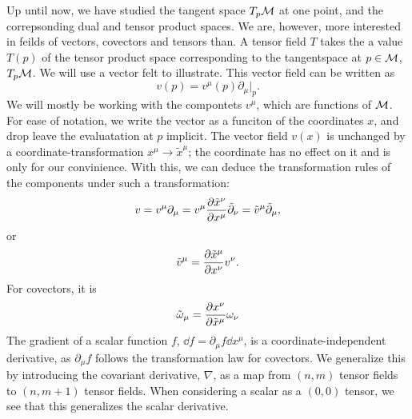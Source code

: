 Up until now, we have studied the tangent space $T_p \mathcal{M}$ at one point, and the correpsonding dual and tensor product spaces.
We are, however, more interested in feilds of vectors, covectors and tensors than.
A tensor field $T$ takes the a value $T(p)$ of the tensor product space corresponding to the tangentspace at $p\in \mathcal{M}$, $T_p \mathcal{M}$.
We will use a vector felt to illustrate.
This vector field can be written as
%
\begin{equation}
    v(p) = v^\mu(p) \partial_\mu |_p. 
\end{equation}
%
We will mostly be working with the compontets $v^\mu$, which are functions of $\mathcal{M}$.
For ease of notation, we write the vector as a funciton of the coordinates $x$, and drop leave the evaluatation at $p$ implicit.
The vector field $v(x)$ is unchanged by a coordinate-transformation $x^\mu \rightarrow \tilde x^\mu$; the coordinate has no effect on it and is only for our convinience. 
With this, we can deduce the transformation rules of the components under such a transformation:
%
\begin{equation}
    v = v^\mu \partial_\mu = v^\mu \diffp{\tilde x^\nu}{x^\mu} \tilde  \partial_\nu
    = \tilde v^\mu \tilde \partial_\mu, 
\end{equation}
%
or
%
\begin{equation}
    \tilde v^\mu = \diffp{\tilde x^\mu}{x^\nu} v^\nu.
\end{equation}
%
For covectors, it is
%
\begin{equation}
    \tilde \omega_\mu = \diffp{x^\nu}{\tilde x^\mu} \omega_\nu
\end{equation}
%
The gradient of a scalar function $f$, $\dd f = \partial_\mu f \dd x^\mu$, is a coordinate-independent derivative, as $\partial_\mu f$ follows the transformation law for covectors.
We generalize this by introducing the covariant derivative, $\nabla$, as a map from $(n, m)$ tensor fields to $(n, m+1)$ tensor fields.
When considering a scalar as a $(0, 0)$ tensor, we see that this generalizes the scalar derivative.

